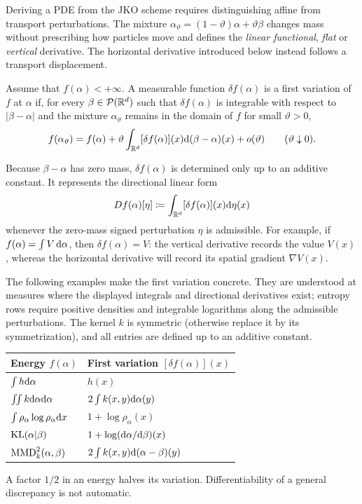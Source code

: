 Deriving a PDE from the JKO scheme requires distinguishing affine from transport perturbations. The mixture \(\alpha_\vartheta=(1-\vartheta)\alpha+\vartheta\beta\) changes mass without prescribing how particles move and defines the \emph{linear functional}, \emph{flat} or \emph{vertical} derivative. The horizontal derivative introduced below instead follows a transport displacement.
\begin{defn}\label{def-first-variation}
	Assume that \(f(\alpha)<+\infty\). A measurable function \(\delta f(\alpha)\) is a first variation of \(f\) at \(\alpha\) if, for every \(\beta\in\mathcal{P}(\mathbb{R}^d)\) such that \(\delta f(\alpha)\) is integrable with respect to \(\lvert\beta-\alpha\rvert\) and the mixture \(\alpha_\vartheta\) remains in the domain of \(f\) for small \(\vartheta>0\),
	\[
		f(\alpha_\vartheta)
		=
		f(\alpha)
		+\vartheta\int_{\mathbb{R}^d}[\delta f(\alpha)](x)
		\mathrm{d}(\beta-\alpha)(x)
		+o(\vartheta)
		\qquad(\vartheta\downarrow0).
	\]
\end{defn}
Because \(\beta-\alpha\) has zero mass, \(\delta f(\alpha)\) is determined only up to an additive constant. It represents the directional linear form
\[
	Df(\alpha)[\eta]
	\coloneqq
	\int_{\mathbb{R}^d}[\delta f(\alpha)](x)\mathrm{d}\eta(x)
\]
whenever the zero-mass signed perturbation \(\eta\) is admissible. For example, if \(f(\alpha)=\int V\,\mathrm{d}\alpha\), then \(\delta f(\alpha)=V\): the vertical derivative records the value \(V(x)\), whereas the horizontal derivative will record its spatial gradient \(\nabla V(x)\).

The following examples make the first variation concrete. They are understood at measures where the displayed integrals and directional derivatives exist; entropy rows require positive densities and integrable logarithms along the admissible perturbations. The kernel $k$ is symmetric (otherwise replace it by its symmetrization), and all entries are defined up to an additive constant.
\begin{center}
\renewcommand{\arraystretch}{1.3}
\begin{tabular}{@{}ll@{}}
\hline
Energy $f(\alpha)$ & First variation $[\delta f(\alpha)](x)$ \\
\hline
$\int h\mathrm{d}\alpha$ & $h(x)$ \\
$\iint k\mathrm{d}\alpha\mathrm{d}\alpha$ & $2\int k(x,y)\mathrm{d}\alpha(y)$ \\
$\int\rho_\alpha\log\rho_\alpha\mathrm{d} x$ & $1+\log\rho_\alpha(x)$ \\
$\operatorname{KL}(\alpha|\beta)$ & $1+\log(\mathrm{d}\alpha/\mathrm{d}\beta)(x)$ \\
$\operatorname{MMD}_k^2(\alpha,\beta)$ & $2\int k(x,y)\mathrm{d}(\alpha-\beta)(y)$ \\
\hline
\end{tabular}
\end{center}
A factor $1/2$ in an energy halves its variation. Differentiability of a general discrepancy is not automatic.

